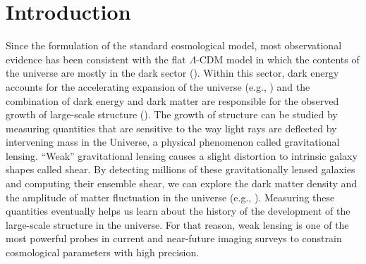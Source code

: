 \documentclass[fleqn,usenatbib]{mnras}
\begin{document}
\section{Introduction}

Since the formulation of the standard cosmological model, most observational evidence has been consistent with the flat $\Lambda$-CDM model in which the contents of the universe are mostly in the dark sector (\citealt{2020A&A...641A...8P, 2020MNRAS.498.2492G, 2020MNRAS.499.5527T, 2021A&A...645A.104A, 2022PhRvD.105b3520A, 2022arXiv220204077B}). Within this sector, dark energy accounts for the accelerating expansion of the universe (e.g., \citealt{1998AJ....116.1009R, 1999AIPC..478..129P}) and the combination of dark energy and dark matter are responsible for the observed growth of large-scale structure (\citealt{2015RPPh...78h6901K, 2017grle.book.....D}). The growth of structure can be studied by measuring quantities that are sensitive to the way light rays are deflected by intervening mass in the Universe, a physical phenomenon called gravitational lensing. “Weak” gravitational lensing causes a slight distortion to intrinsic galaxy shapes called shear. By detecting millions of these gravitationally lensed galaxies and computing their ensemble shear, we can explore the dark matter density and the amplitude of matter fluctuation in the universe (e.g., \citealt{2001PhR...340..291B}). Measuring these quantities eventually helps us learn about the history of the development of the large-scale structure in the universe. For that reason, weak lensing is one of the most powerful probes in current and near-future imaging surveys to constrain cosmological parameters with high precision. 
\end{document}
